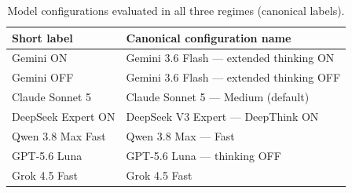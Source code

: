 \begin{table}[t]
\centering
\caption{Model configurations evaluated in all three regimes (canonical labels).}
\label{tab:models}
\begin{tabular}{@{}ll@{}}
\toprule
\textbf{Short label} & \textbf{Canonical configuration name} \\
\midrule
Gemini ON & Gemini 3.6 Flash --- extended thinking ON \\
Gemini OFF & Gemini 3.6 Flash --- extended thinking OFF \\
Claude Sonnet 5 & Claude Sonnet 5 --- Medium (default) \\
DeepSeek Expert ON & DeepSeek V3 Expert --- DeepThink ON \\
Qwen 3.8 Max Fast & Qwen 3.8 Max --- Fast \\
GPT-5.6 Luna & GPT-5.6 Luna --- thinking OFF \\
Grok 4.5 Fast & Grok 4.5 Fast \\
\bottomrule
\end{tabular}
\end{table}
